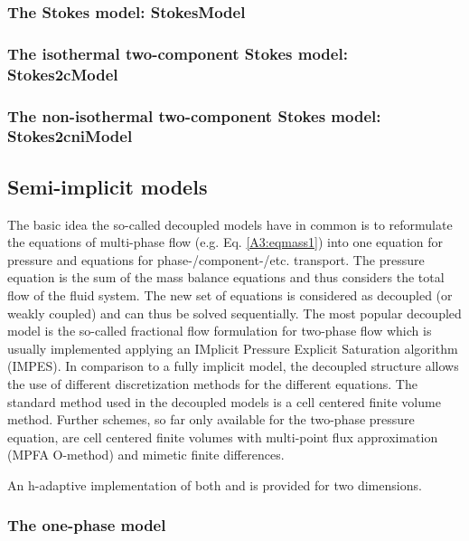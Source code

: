 \subsubsection{The Stokes model: StokesModel} 


\subsubsection{The isothermal two-component Stokes model: Stokes2cModel} 


\subsubsection{The non-isothermal two-component Stokes model: Stokes2cniModel} 


\subsection{Semi-implicit models}
%
The basic idea the so-called decoupled models have in common is to reformulate the equations of multi-phase flow (e.g. Eq. \ref{A3:eqmass1}) into one equation for pressure and equations for phase-/component-/etc. transport. The pressure equation is the sum of the mass balance equations and thus considers the total flow of the fluid system. The new set of equations is considered as decoupled (or weakly coupled) and can thus be solved sequentially. The most popular decoupled model is the so-called fractional flow formulation for two-phase flow which is usually implemented applying an IMplicit Pressure Explicit Saturation algorithm (IMPES).
In comparison to a fully implicit model, the decoupled structure allows the use of different discretization methods for the different equations. The standard method used in the decoupled models is a cell centered finite volume method. Further schemes, so far only available for the two-phase pressure equation, are cell centered finite volumes with multi-point flux approximation (MPFA O-method) and mimetic finite differences.

An h-adaptive implementation of both  and  is provided for two dimensions.
%
\subsubsection{The one-phase model}


